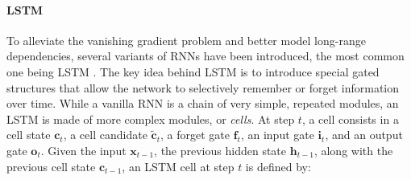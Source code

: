 




\paragraph{\ac{LSTM}}

To alleviate the vanishing gradient problem and better model long-range dependencies, several variants of \acp{RNN} have been introduced, the most common one being \ac{LSTM} \citep{hochreiter1997long}. The key idea behind \ac{LSTM} is to introduce special gated structures that allow the network to selectively remember or forget information over time. While a vanilla \ac{RNN} is a chain of very simple, repeated modules, an \ac{LSTM} is made of more complex modules, or \textit{cells}. At step $t$, a cell consists in a cell state $\bm{c}_t$, a cell candidate $\tilde{\bm{c}}_t$, a forget gate $\bm{f}_t$, an input gate $\bm{i}_t$, and an output gate $\bm{o}_t$. Given the input $\bm{x}_{t-1}$, the previous hidden state $\bm{h}_{t-1}$, along with the previous cell state $\bm{c}_{t-1}$, an \ac{LSTM} cell at step $t$ is defined by:

